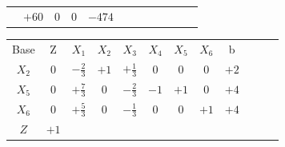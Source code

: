 \begin{frame}
{\begin{table}
\begin{tabular}{c c c c c c c c c c c c}
				& \cellcolor{yellow!50} $\scriptstyle +60$
				& \cellcolor{yellow!50} $\scriptstyle 0$
				& \cellcolor{yellow!50} $\scriptstyle 0$ 
				& \cellcolor{yellow!50} $\scriptstyle -474$  \\
			\end{tabular}
		\end{table}			
	}
	{
		\begin{table}		
			\begin{tabular}{c c c c c c c c c c c c}
				\cellcolor{blue!100} \color{white} \scriptsize Base 
				&\cellcolor{blue!100} \color{white} \scriptsize Z 
				&\cellcolor{blue!100} \color{white} $\scriptstyle X_1$ 
				&\cellcolor{blue!100} \color{red} $\scriptstyle X_2$ 
				&\cellcolor{blue!100} \color{white}   $\scriptstyle X_3$ 
				&\cellcolor{blue!100} \color{white} $\scriptstyle X_4$ 
				&\cellcolor{blue!100} \color{red}   $\scriptstyle X_5$ 
				&\cellcolor{blue!100} \color{red}   $\scriptstyle X_6$ 
				&\cellcolor{blue!100} \color{white} \scriptsize b
				&
				&
				& \\
				\cellcolor{blue!100} \color{red} $\scriptstyle X_2$
				& \cellcolor{yellow!50} $\scriptstyle 0$
				& \cellcolor{gray!50} $\scriptstyle -\frac{2}{3}$
				& \cellcolor{yellow!50} $\scriptstyle +1$
				& \cellcolor{yellow!50} $\scriptstyle +\frac{1}{3}$
				& \cellcolor{yellow!50} $\scriptstyle 0$
				& \cellcolor{yellow!50} $\scriptstyle 0$
				& \cellcolor{yellow!50} $\scriptstyle 0$
				& \cellcolor{yellow!50} $\scriptstyle +2$ \\
			    \cellcolor{blue!100} \color{red} $\scriptstyle X_5$
				& \cellcolor{yellow!50} $\scriptstyle 0$
				& \cellcolor{gray!50} $\scriptstyle +\frac{7}{3}$
				& \cellcolor{yellow!50} $\scriptstyle 0$
				& \cellcolor{yellow!50} $\scriptstyle -\frac{2}{3}$			
				& \cellcolor{yellow!50} $\scriptstyle -1$
				& \cellcolor{yellow!50} $\scriptstyle +1$
				& \cellcolor{yellow!50} $\scriptstyle 0$ 
				& \cellcolor{yellow!50} $\scriptstyle +4$ \\
				\cellcolor{blue!100} \color{red} $\scriptstyle X_6$
				& \cellcolor{yellow!50} $\scriptstyle 0$
				& \cellcolor{gray!50} $\scriptstyle +\frac{5}{3}$
				& \cellcolor{yellow!50} $\scriptstyle 0$
				& \cellcolor{yellow!50} $\scriptstyle -\frac{1}{3}$
				& \cellcolor{yellow!50} $\scriptstyle 0$
				& \cellcolor{yellow!50} $\scriptstyle 0$
				& \cellcolor{yellow!50} $\scriptstyle +1$
				& \cellcolor{yellow!50} $\scriptstyle +4$ \\
				\cellcolor{blue!100} \color{white} $\scriptstyle Z$
				& \cellcolor{yellow!50} $\scriptstyle +1$

\end{tabular}
\end{table}}
\end{frame}
